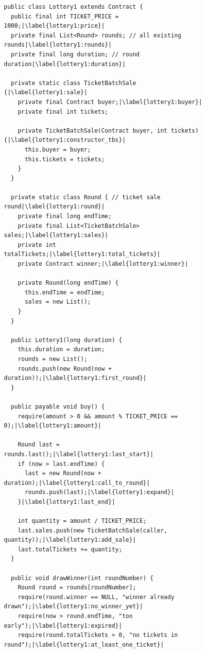 \begin{figure}
  \begin{lstlisting}[language=pseudo]
public class Lottery1 extends Contract {
  public final int TICKET_PRICE = 1000;|\label{lottery1:price}|
  private final List<Round> rounds; // all existing rounds|\label{lottery1:rounds}|
  private final long duration; // round duration|\label{lottery1:duration}|

  private static class TicketBatchSale {|\label{lottery1:sale}|
    private final Contract buyer;|\label{lottery1:buyer}|
    private final int tickets;

    private TicketBatchSale(Contract buyer, int tickets) {|\label{lottery1:constructor_tbs}|
      this.buyer = buyer;
      this.tickets = tickets;
    }
  }

  private static class Round { // ticket sale round|\label{lottery1:round}|
    private final long endTime;
    private final List<TicketBatchSale> sales;|\label{lottery1:sales}|
    private int totalTickets;|\label{lottery1:total_tickets}|
    private Contract winner;|\label{lottery1:winner}|

    private Round(long endTime) {
      this.endTime = endTime;
      sales = new List();
    }
  }

  public Lottery1(long duration) {
    this.duration = duration;
    rounds = new List();
    rounds.push(new Round(now + duration));|\label{lottery1:first_round}|
  }

  public payable void buy() {
    require(amount > 0 && amount % TICKET_PRICE == 0);|\label{lottery1:amount}|

    Round last = rounds.last();|\label{lottery1:last_start}|
    if (now > last.endTime) {
      last = new Round(now + duration);|\label{lottery1:call_to_round}|
      rounds.push(last);|\label{lottery1:expand}|
    }|\label{lottery1:last_end}|

    int quantity = amount / TICKET_PRICE;
    last.sales.push(new TicketBatchSale(caller, quantity));|\label{lottery1:add_sale}|
    last.totalTickets += quantity;
  }

  public void drawWinner(int roundNumber) {
    Round round = rounds[roundNumber];
    require(round.winner == NULL, "winner already drawn");|\label{lottery1:no_winner_yet}|
    require(now > round.endTime, "too early");|\label{lottery1:expired}|
    require(round.totalTickets > 0, "no tickets in round");|\label{lottery1:at_least_one_ticket}|


\end{lstlisting}
\end{figure}
